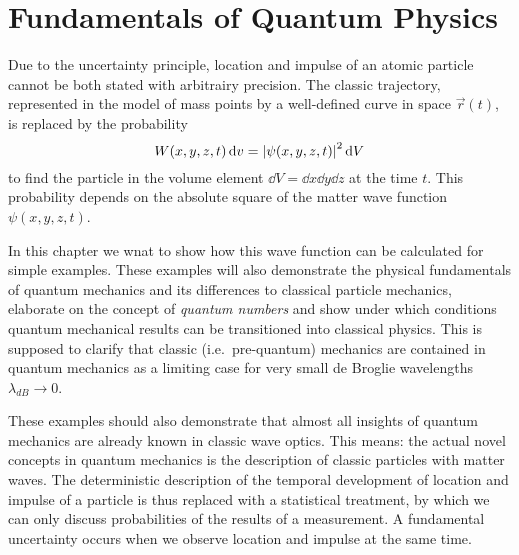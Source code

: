 \documentclass[../../script.tex]{subfiles}
\begin{document}
    \chapter{Fundamentals of Quantum Physics}
    \minitoc
    \vspace*{\fill}\par
    \pagebreak  

    Due to the uncertainty principle, location and impulse of an atomic particle cannot be both stated with arbitrairy precision.
    The classic trajectory, represented in the model of mass points by a well-defined curve in space $\vec{r}(t)$, is replaced by the probability
    \begin{equation}
        W(x, y, z, t) \dd{v} = \abs{\psi(x, y, z, t)}^2 \dd{V}
    \end{equation}
    to find the particle in the volume element $\dd{V} = \dd{x}\dd{y}\dd{z}$ at the time $t$. This probability depends on the absolute square of the matter wave function $\psi(x, y, z, t)$.

    In this chapter we wnat to show how this wave function can be calculated for simple examples. These examples will also demonstrate the physical fundamentals of quantum mechanics and its
    differences to classical particle mechanics, elaborate on the concept of \textit{quantum numbers} and show under which conditions quantum mechanical results can be transitioned into classical physics.
    This is supposed to clarify that classic (i.e.\ pre-quantum) mechanics are contained in quantum mechanics as a limiting case for very small de Broglie wavelengths $\lambda_{dB} \rightarrow 0$.

    These examples should also demonstrate that almost all insights of quantum mechanics are already known in classic wave optics. This means: the actual novel concepts in quantum mechanics
    is the description of classic particles with matter waves. The deterministic description of the temporal development of location and impulse of a particle is thus replaced with a statistical
    treatment, by which we can only discuss probabilities of the results of a measurement. A fundamental uncertainty occurs when we observe location and impulse at the same time.

    
    
\end{document}
